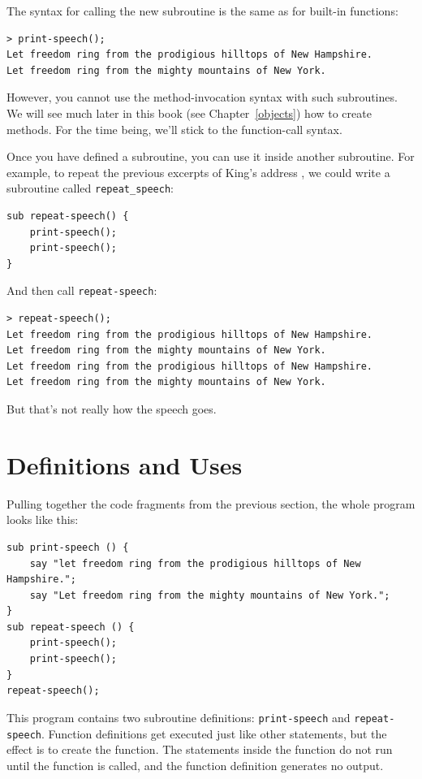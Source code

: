 The syntax for calling the new subroutine is the same as
for built-in functions:

\begin{verbatim}
> print-speech();
Let freedom ring from the prodigious hilltops of New Hampshire.
Let freedom ring from the mighty mountains of New York.
\end{verbatim}
%

However, you cannot use the method-invocation syntax with 
such subroutines. We will see much later in this book (see 
Chapter~\ref{objects}) how to create methods. For the time 
being, we'll stick to the function-call syntax.

Once you have defined a subroutine, you can use it inside another
subroutine.  For example, to repeat the previous excerpts of
King's address ,  we could write a subroutine called \verb"repeat_speech":

\begin{verbatim}
sub repeat-speech() {
    print-speech();
    print-speech();
}
\end{verbatim}
%
And then call \verb"repeat-speech":

\begin{verbatim}
> repeat-speech();
Let freedom ring from the prodigious hilltops of New Hampshire.
Let freedom ring from the mighty mountains of New York.
Let freedom ring from the prodigious hilltops of New Hampshire.
Let freedom ring from the mighty mountains of New York.
\end{verbatim}
%
But that's not really how the speech goes.


\section{Definitions and Uses}

Pulling together the code fragments from the previous section, the
whole program looks like this:

\begin{verbatim}
sub print-speech () {
    say "let freedom ring from the prodigious hilltops of New Hampshire.";
    say "Let freedom ring from the mighty mountains of New York.";
}
sub repeat-speech () {
    print-speech();
    print-speech();
}
repeat-speech();
\end{verbatim}
%
This program contains two subroutine definitions: \verb"print-speech" and
\verb"repeat-speech".  Function definitions get executed just like other
statements, but the effect is to create the function.  The statements
inside the function do not run until the function is called, and
the function definition generates no output.

